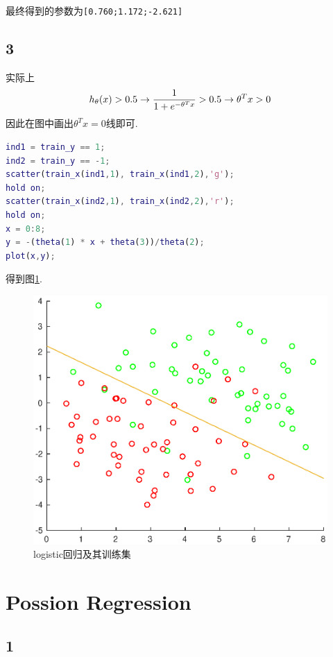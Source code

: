 \documentclass{ctexart}
\begin{document}
最终得到的参数为\verb|[0.760;1.172;-2.621]|

\subsection{3}
实际上
\begin{equation}
	h_\theta(x) > 0.5 \to \frac{1}{1 + e^{-\theta^Tx}} > 0.5 \to \theta^Tx > 0 \notag
\end{equation}
因此在图中画出$\theta^Tx = 0$线即可.

\begin{lstlisting}[language = MATLAB]
% draw the distribution of training data and the final model
ind1 = train_y == 1;
ind2 = train_y == -1;
scatter(train_x(ind1,1), train_x(ind1,2),'g');
hold on;
scatter(train_x(ind2,1), train_x(ind2,2),'r');
hold on;
x = 0:8;
y = -(theta(1) * x + theta(3))/theta(2);
plot(x,y);
\end{lstlisting}
得到图\ref{logistic}.

\begin{figure}[ht]
	\includegraphics[width = \textwidth]{logistic.eps}
	\caption{logistic回归及其训练集}
	\label{logistic}
\end{figure}

\section{Possion Regression}
\subsection{1}
\end{document}

